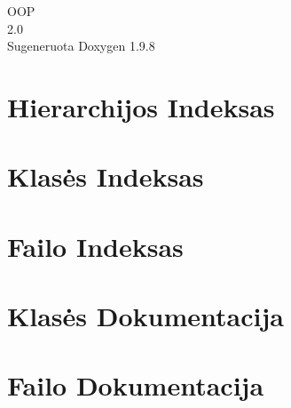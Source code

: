 \documentclass[twoside]{book}
\newcommand{\+}{\discretionary{\mbox{\scriptsize$\hookleftarrow$}}{}{}}
\newcommand{\clearemptydoublepage}{%
    \newpage{\pagestyle{empty}\cleardoublepage}%
  }
\begin{document}
  \raggedbottom
    \hypersetup{pageanchor=false,
                bookmarksnumbered=true,
                pdfencoding=unicode
               }
  \begin{titlepage}
  \vspace*{7cm}
  \begin{center}%
  {\Large OOP}\\
  [1ex]\large 2.\+0 \\
  \vspace*{1cm}
  {\large Sugeneruota Doxygen 1.9.8}\\
  \end{center}
  \end{titlepage}
  \clearemptydoublepage
  \tableofcontents
  \clearemptydoublepage
  \hypersetup{pageanchor=true}
\chapter{Hierarchijos Indeksas}

\chapter{Klasės Indeksas}

\chapter{Failo Indeksas}

\chapter{Klasės Dokumentacija}



\chapter{Failo Dokumentacija}










  \backmatter
  \newpage
  \clearemptydoublepage
  \printindex
\end{document}
